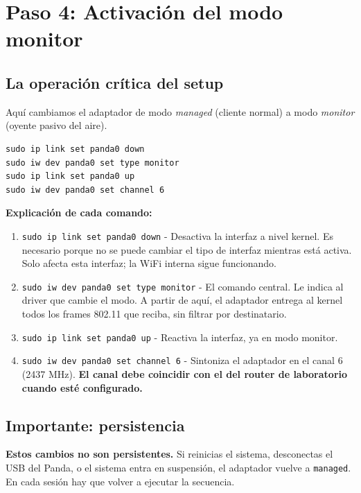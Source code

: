 \documentclass[11pt,a4paper]{article}
\begin{document}
\section{Paso 4: Activación del modo monitor}

\subsection{La operación crítica del setup}
Aquí cambiamos el adaptador de modo \emph{managed} (cliente normal) a
modo \emph{monitor} (oyente pasivo del aire).

\begin{lstlisting}
sudo ip link set panda0 down
sudo iw dev panda0 set type monitor
sudo ip link set panda0 up
sudo iw dev panda0 set channel 6
\end{lstlisting}

\textbf{Explicación de cada comando:}

\begin{enumerate}
  \item \texttt{sudo ip link set panda0 down} - Desactiva la interfaz a
    nivel kernel. Es necesario porque no se puede cambiar el tipo de
    interfaz mientras está activa. Solo afecta esta interfaz; la WiFi
    interna sigue funcionando.
  \item \texttt{sudo iw dev panda0 set type monitor} - El comando
    central. Le indica al driver que cambie el modo. A partir de aquí,
    el adaptador entrega al kernel todos los frames 802.11 que reciba,
    sin filtrar por destinatario.
  \item \texttt{sudo ip link set panda0 up} - Reactiva la interfaz, ya
    en modo monitor.
  \item \texttt{sudo iw dev panda0 set channel 6} - Sintoniza el
    adaptador en el canal 6 (2437 MHz). \textbf{El canal debe coincidir
    con el del router de laboratorio cuando esté configurado.}
\end{enumerate}

\subsection{Importante: persistencia}
\textbf{Estos cambios no son persistentes.} Si reinicias el sistema,
desconectas el USB del Panda, o el sistema entra en suspensión, el
adaptador vuelve a \texttt{managed}. En cada sesión hay que volver a
ejecutar la secuencia.
\end{document}
